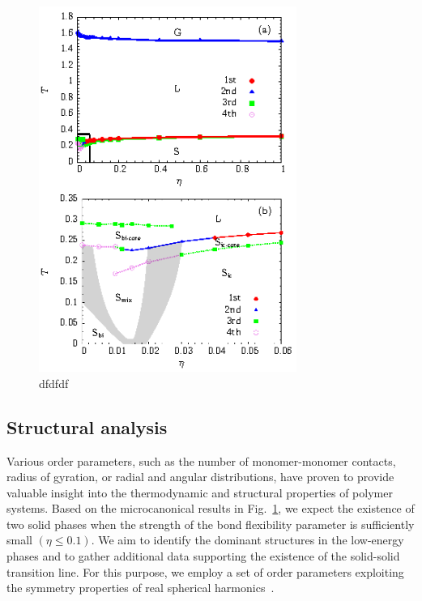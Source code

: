 \documentclass[12pt]{report}
\begin{document}
\begin{figure}
\center
    \includegraphics[width=0.75\textwidth]{chapter6Figs/phaseDiag55.eps}%
    \caption{\label{phase_diagram} 
    dfdfdf}
\end{figure}
\subsection{Structural analysis}
Various order parameters, such as the number of monomer-monomer
contacts, radius of gyration, or radial and angular distributions, have
proven to provide valuable insight into the thermodynamic and structural
properties of polymer systems. Based on the microcanonical results in
Fig.~\ref{phase_diagram}, we expect the existence of two solid phases
when the strength of the bond flexibility parameter is sufficiently small
$(\eta \leq 0.1)$. We aim to identify the dominant structures in the
low-energy phases and to gather additional data supporting the existence of
the
solid-solid transition line. For this purpose, we employ a set of order
parameters exploiting the symmetry properties of real spherical
harmonics~\cite{Neirotti2000}.
\end{document}
